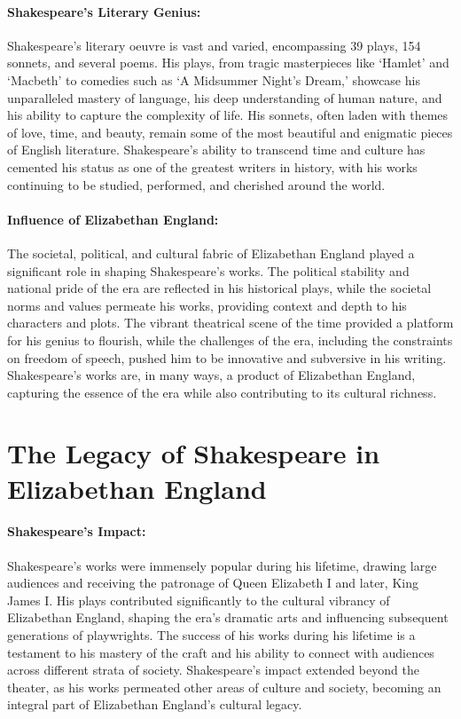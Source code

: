 \documentclass[a4paper,12pt]{book}
\begin{document}
\paragraph{Shakespeare’s Literary Genius:}
Shakespeare’s literary oeuvre is vast and varied, encompassing 39 plays, 154 sonnets, and several poems. His plays, from tragic masterpieces like ‘Hamlet’ and ‘Macbeth’ to comedies such as ‘A Midsummer Night’s Dream,’ showcase his unparalleled mastery of language, his deep understanding of human nature, and his ability to capture the complexity of life. His sonnets, often laden with themes of love, time, and beauty, remain some of the most beautiful and enigmatic pieces of English literature. Shakespeare’s ability to transcend time and culture has cemented his status as one of the greatest writers in history, with his works continuing to be studied, performed, and cherished around the world.

\paragraph{Influence of Elizabethan England:}
The societal, political, and cultural fabric of Elizabethan England played a significant role in shaping Shakespeare’s works. The political stability and national pride of the era are reflected in his historical plays, while the societal norms and values permeate his works, providing context and depth to his characters and plots. The vibrant theatrical scene of the time provided a platform for his genius to flourish, while the challenges of the era, including the constraints on freedom of speech, pushed him to be innovative and subversive in his writing. Shakespeare’s works are, in many ways, a product of Elizabethan England, capturing the essence of the era while also contributing to its cultural richness.

\section*{The Legacy of Shakespeare in Elizabethan England}

\paragraph{Shakespeare’s Impact:}
Shakespeare’s works were immensely popular during his lifetime, drawing large audiences and receiving the patronage of Queen Elizabeth I and later, King James I. His plays contributed significantly to the cultural vibrancy of Elizabethan England, shaping the era’s dramatic arts and influencing subsequent generations of playwrights. The success of his works during his lifetime is a testament to his mastery of the craft and his ability to connect with audiences across different strata of society. Shakespeare’s impact extended beyond the theater, as his works permeated other areas of culture and society, becoming an integral part of Elizabethan England’s cultural legacy.
\end{document}
